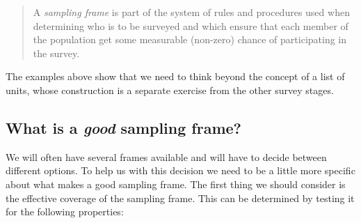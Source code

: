 \documentclass[
]{book}
\begin{document}
\begin{quote}
A \emph{sampling frame} is part of the system of rules and procedures used when
determining who is to be surveyed and which ensure that each member of the
population get some measurable (non-zero) chance of participating in the
survey.
\end{quote}

The examples above show that we need to think beyond the concept of a list of
units, whose construction is a separate exercise from the other survey stages.

\subsection{\texorpdfstring{What is a \emph{good} sampling frame?}{What is a good sampling frame?}}\label{what-is-a-good-sampling-frame}

We will often have several frames available and will have to decide between
different options. To help us with this decision we need to be a little more
specific about what makes a good sampling frame. The first thing we should
consider is the effective coverage of the sampling frame. This can be
determined by testing it for the following properties:
\end{document}
